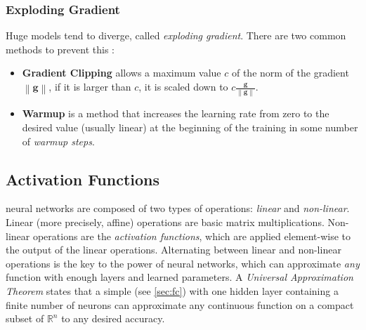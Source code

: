 \subsubsection*{Exploding Gradient}
Huge models tend to diverge, called \emph{exploding gradient}.
There are two common methods to prevent this \cite{deeplearningbook}:
\begin{itemize}
    \item \textbf{Gradient Clipping} allows a maximum value $c$ of the norm of the gradient $\left\lVert \pmb{g} \right\rVert$, if it is larger than $c$, it is scaled down to $c \frac{\pmb{g}}{\left\lVert \pmb{g} \right\rVert}$.
    \item \textbf{Warmup} is a method that increases the learning rate from zero to the desired value (usually linear) at the beginning of the training in some number of \emph{warmup steps}.
\end{itemize}

\subsection{Activation Functions}
\label{sec:activations}
\dl neural networks are composed of two types of operations: \emph{linear} and \emph{non-linear}.
Linear (more precisely, affine) operations are basic matrix multiplications.
Non-linear operations are the \emph{activation functions}, which are applied element-wise to the output of the linear operations.
Alternating between linear and non-linear operations is the key to the power of \dl neural networks, which can approximate \emph{any} function with enough layers and learned parameters.
A \emph{Universal Approximation Theorem} \cite{universal_app_thm} states that a simple \fc (see \cref{sec:fc}) with one hidden layer containing a finite number of neurons can approximate any continuous function on a compact subset of $\mathbb{R}^n$ to any desired accuracy.

